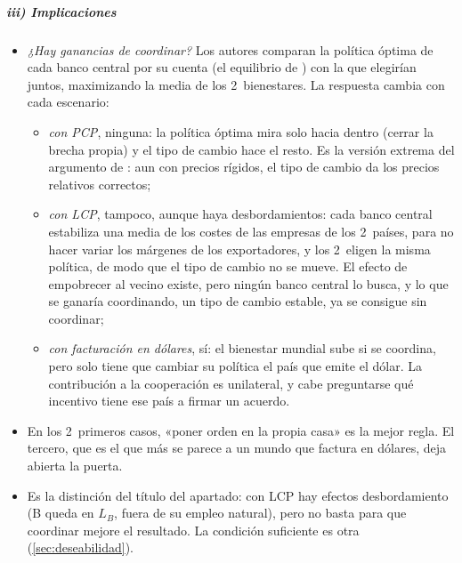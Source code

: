 \documentclass[11pt]{article}
\begin{document}
\subparagraph{iii) Implicaciones}
\begin{itemize}
\item \emph{¿Hay ganancias de coordinar?} Los autores comparan la política óptima de cada banco central por su cuenta (el equilibrio de ) con la que elegirían juntos, maximizando la media de los 2~bienestares\nocite{CorsettiPesenti2009}. La respuesta cambia con cada escenario:
  \begin{itemize}
  \item \emph{con PCP}, ninguna: la política óptima mira solo hacia dentro (cerrar la brecha propia) y el tipo de cambio hace el resto. Es la versión extrema del argumento de \textcite{Friedman1953Case}: aun con precios rígidos, el tipo de cambio da los precios relativos correctos;
  \item \emph{con LCP}, tampoco, aunque haya desbordamientos: cada banco central estabiliza una media de los costes de las empresas de los 2~países, para no hacer variar los márgenes de los exportadores, y los 2~eligen la misma política, de modo que el tipo de cambio no se mueve. El efecto de empobrecer al vecino existe, pero ningún banco central lo busca, y lo que se ganaría coordinando, un tipo de cambio estable, ya se consigue sin coordinar\nocite{CorsettiPesenti2009,DevereuxEngel2003};
  \item \emph{con facturación en dólares}, sí: el bienestar mundial sube si se coordina, pero solo tiene que cambiar su política el país que emite el dólar. La contribución a la cooperación es unilateral, y cabe preguntarse qué incentivo tiene ese país a firmar un acuerdo.
  \end{itemize}
\item En los 2~primeros casos, «poner orden en la propia casa» es la mejor regla. El tercero, que es el que más se parece a un mundo que factura en dólares, deja abierta la puerta.
\item Es la distinción del título del apartado: con LCP hay efectos desbordamiento (B queda en $L_B$, fuera de su empleo natural), pero no basta para que coordinar mejore el resultado. La condición suficiente es otra (\ref{sec:deseabilidad}).
\end{itemize}
\end{document}
